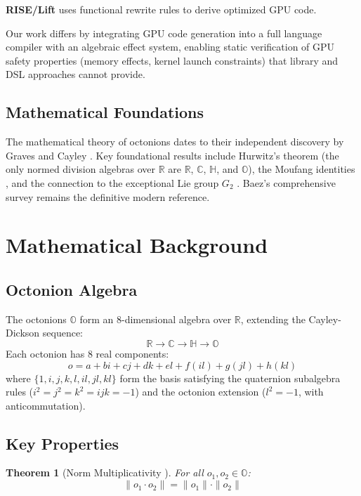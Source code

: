\documentclass[11pt,a4paper]{article}
\newtheorem{theorem}{Theorem}
\newcommand{\R}{\mathbb{R}}
\newcommand{\C}{\mathbb{C}}
\newcommand{\HH}{\mathbb{H}}
\newcommand{\Oct}{\mathbb{O}}
\begin{document}
\textbf{RISE/Lift} \cite{steuwer2017} uses functional rewrite rules to derive optimized GPU code.

Our work differs by integrating GPU code generation into a full language compiler with an algebraic effect system, enabling static verification of GPU safety properties (memory effects, kernel launch constraints) that library and DSL approaches cannot provide.

\subsection{Mathematical Foundations}

The mathematical theory of octonions dates to their independent discovery by Graves \cite{graves1845} and Cayley \cite{cayley1845}. Key foundational results include Hurwitz's theorem \cite{hurwitz1898} (the only normed division algebras over $\R$ are $\R$, $\C$, $\HH$, and $\Oct$), the Moufang identities \cite{moufang1935}, and the connection to the exceptional Lie group $G_2$ \cite{cartan1914}. Baez's comprehensive survey \cite{baez2002} remains the definitive modern reference.

\section{Mathematical Background}
\label{sec:background}

\subsection{Octonion Algebra}

The octonions $\Oct$ form an 8-dimensional algebra over $\R$, extending the Cayley-Dickson sequence:
\[
\R \to \C \to \HH \to \Oct
\]
Each octonion has 8 real components:
\[
o = a + bi + cj + dk + el + f(il) + g(jl) + h(kl)
\]
where $\{1, i, j, k, l, il, jl, kl\}$ form the basis satisfying the quaternion subalgebra rules ($i^2 = j^2 = k^2 = ijk = -1$) and the octonion extension ($l^2 = -1$, with anticommutation).

\subsection{Key Properties}

\begin{theorem}[Norm Multiplicativity \cite{hurwitz1898}]
For all $o_1, o_2 \in \Oct$:
\[
\|o_1 \cdot o_2\| = \|o_1\| \cdot \|o_2\|
\]
\end{theorem}
\end{document}
